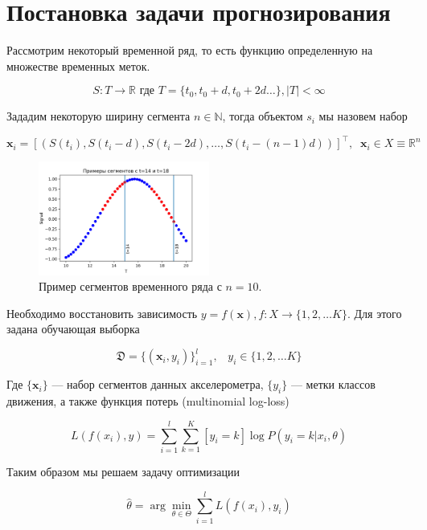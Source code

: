 \documentclass[12pt, fleqn, unicode]{article}
\newcommand{\bx}{\mathbf{x}}
\newcommand{\R}{\mathbb{R}}
\newcommand{\N}{\mathbb{N}}
\newcommand{\sbrs}[1]{\left[#1\right]}
\begin{document}
\newpage
\section{Постановка задачи прогнозирования}

Рассмотрим некоторый временной ряд, то есть функцию определенную на множестве
временных меток.

$$
S: T \to \R \text{ где } T = \{t_0, t_0 + d, t_0 + 2d \ldots\}, |T| < \infty
$$

Зададим некоторую ширину сегмента $n \in \N$, тогда объектом $s_i$ мы
назовем набор

$$
\bx_i = \sbrs{(S(t_i), S(t_i - d), S(t_i - 2d), \ldots, S(t_i - (n - 1)d))}^\intercal,
\;\; \bx_i \in X \equiv \R^n
$$

\begin{figure}[ht]
    \caption{Пример сегментов временного ряда с $n=10$.}
    \centering
      \includegraphics[width=0.5\textwidth]{../pics/segment_def.png}
\end{figure}

Необходимо восстановить зависимость $y = f(\bx), f: X \to \{1, 2, \ldots K\}$.
Для этого задана обучающая выборка

$$
\mathfrak{D} = \{ (\bx_i, y_i) \}_{i=1}^l, \;\;\; y_i \in \{1, 2, \ldots K\}
$$

Где $\{\bx_i\}$ — набор сегментов данных акселерометра, $\{y_i\}$ — метки классов
движения,
а также функция потерь (multinomial log-loss)

\begin{equation} \label{init-logloss}
L(f(x_i), y) = \sum_{i=1}^l\sum_{k=1}^K [y_i = k]\log P(y_i = k| x_i, \theta)
\end{equation}

Таким образом мы решаем задачу оптимизации

$$
\hat{\theta} = \arg\min_{\theta \in \Theta} \sum_{i = 1}^l L(f(x_i), y_i)
$$
\end{document}
